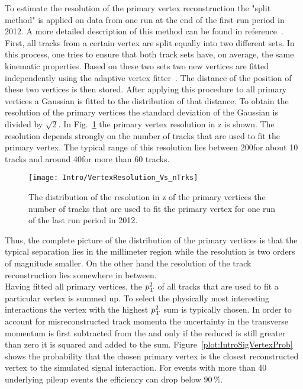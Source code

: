 To estimate the resolution of the primary vertex reconstruction the "split method" is applied on data from one run at the end of the first run period in 2012. A more detailed description of this method can be found in reference~. First, all tracks from a certain vertex are split equally into two different sets. In this process, one tries to ensure that both track sets have, on average, the same kinematic properties. Based on these two sets two new vertices are fitted independently using the adaptive vertex fitter~\cite{CMS-PAPER-TRK-11-001}. The distance of the position of these two vertices is then stored. After applying this procedure to all primary vertices a Gaussian is fitted to the distribution of that distance. To obtain the resolution of the primary vertices the standard deviation of the Gaussian is divided by $\sqrt{2}$. In Fig.~\ref{plot:IntroVertexRes} the primary vertex resolution in z is shown. The resolution depends strongly on the number of tracks that are used to fit the primary vertex. The typical range of this resolution lies between 200\mum for about 10 tracks and around 40\mum for more than 60 tracks.

\begin{figure}[Htb]
    \centering
    \texttt{[image: Intro/VertexResolution\_Vs\_nTrks]}
    \caption[Vertex resolution \vs number of used tracks]{The distribution of the resolution in z of the primary vertices \vs the number of tracks that are used to fit the primary vertex for one run of the last run period in 2012. \label{plot:IntroVertexRes}}
\end{figure}

Thus, the complete picture of the distribution of the primary vertices is that the typical separation lies in the millimeter region while the resolution is two orders of magnitude smaller. On the other hand the resolution of the track reconstruction lies somewhere in between.\\
Having fitted all primary vertices, the $p_{\mathrm{T}}^{2}$ of all tracks that are used to fit a particular vertex is summed up. To select the physically most interesting interactions the vertex with the highest $p_{\mathrm{T}}^{2}$ sum is typically chosen. In order to account for misreconstructed track momenta the uncertainty in the transverse momentum is first subtracted from the \pt and only if the reduced \pt is still greater than zero it is squared and added to the sum. Figure~\ref{plot:IntroSigVertexProb} shows the probability that the chosen primary vertex is the closest reconstructed vertex to the simulated signal interaction. For events with more than 40 underlying pileup events the efficiency can drop below $90\,{}\%{}$.

